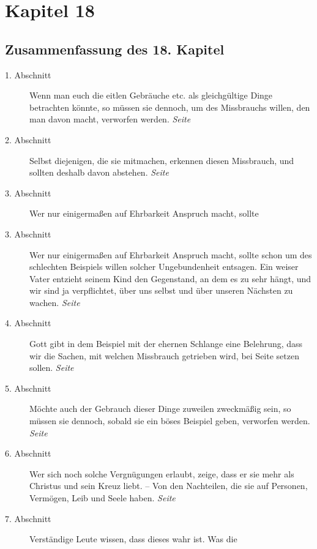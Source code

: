 
\chapter{Kapitel 18} \label{kap18}
\section{Zusammenfassung des 18. Kapitel}

\begin{description}
\item[1. Abschnitt] Wenn man euch die eitlen Gebräuche etc. als gleichgültige
Dinge betrachten könnte, so müssen sie dennoch, um des Missbrauchs willen, den
man davon macht, verworfen werden.
\dotfill \textit{Seite~\pageref{kap18_ab1}}\\
\item[2. Abschnitt] Selbst diejenigen, die sie mitmachen, erkennen diesen
Missbrauch, und sollten deshalb davon abstehen.
\dotfill \textit{Seite~\pageref{kap18_ab2}}\\
\item[3. Abschnitt] Wer nur einigermaßen auf Ehrbarkeit Anspruch macht, sollte
\item[3. Abschnitt] Wer nur einigermaßen auf Ehrbarkeit Anspruch macht, sollte
schon um des schlechten Beispiels willen solcher Ungebundenheit entsagen. Ein
weiser Vater entzieht seinem Kind den Gegenstand, an dem es zu sehr hängt, und
wir sind ja verpflichtet, über uns selbst und über unseren Nächsten zu wachen.
\dotfill \textit{Seite~\pageref{kap18_ab3}}\\
\item[4. Abschnitt] Gott gibt in dem Beispiel mit der ehernen Schlange eine
Belehrung, dass wir die Sachen, mit welchen Missbrauch getrieben wird, bei
Seite setzen sollen.
\dotfill \textit{Seite~\pageref{kap18_ab4}}\\
\item[5. Abschnitt] Möchte auch der Gebrauch dieser Dinge zuweilen zweckmäßig
sein, so müssen sie dennoch, sobald sie ein böses Beispiel geben, verworfen
werden.
\dotfill \textit{Seite~\pageref{kap18_ab5}}\\
\item[6. Abschnitt] Wer sich noch solche Vergnügungen erlaubt, zeige, dass er
sie
mehr als Christus und sein Kreuz liebt. -- Von den Nachteilen, die sie auf
Personen, Vermögen, Leib und Seele haben.
\dotfill \textit{Seite~\pageref{kap18_ab6}}\\
\item[7. Abschnitt] Verständige Leute wissen, dass dieses wahr ist. Was die

\end{description}
